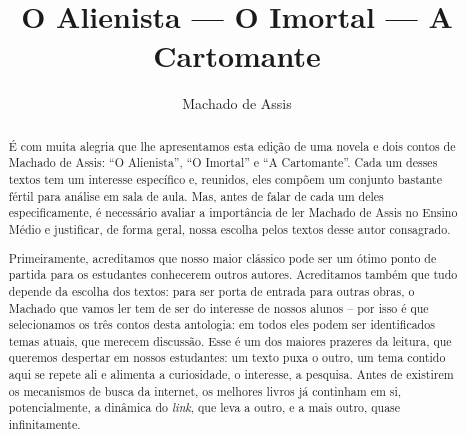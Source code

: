 \documentclass{extarticle}
\begin{document}
\newcommand{\AutorLivro}{Machado de Assis}
\newcommand{\TituloLivro}{O Alienista — O Imortal — A Cartomante}
\newcommand{\Tema}{Ficção, mistério e fantasia}
\newcommand{\Genero}{Conto, crônica e novela}
\newcommand{\imagemCapa}{./images/PNLD0048-01.png}
\newcommand{\issnppub}{978-65-89833-02-4}
\newcommand{\issnepub}{978-65-89833-03-1}
\newcommand{\colaborador}{{Carlos Rogério Duarte Barreiros}}


\title{\TituloLivro}
\author{\AutorLivro}
\def\authornotes{\colaborador}

\date{}
\maketitle

\begin{abstract}

É com muita alegria que lhe apresentamos esta edição de uma novela e
dois contos de Machado de Assis: ``O Alienista'', ``O Imortal'' e ``A
Cartomante''. Cada um desses textos tem um interesse específico e,
reunidos, eles compõem um conjunto bastante fértil para análise em sala
de aula. Mas, antes de falar de cada um deles especificamente, é
necessário avaliar a importância de ler Machado de Assis no Ensino Médio
e justificar, de forma geral, nossa escolha pelos textos desse autor
consagrado.

Primeiramente, acreditamos que nosso maior clássico pode ser um ótimo
ponto de partida para os estudantes conhecerem outros autores.
Acreditamos também que tudo depende da escolha dos textos: para ser
porta de entrada para outras obras, o Machado que vamos ler tem de ser
do interesse de nossos alunos -- por isso é que selecionamos os três
contos desta antologia: em todos eles podem ser identificados temas
atuais, que merecem discussão. Esse é um dos maiores prazeres da
leitura, que queremos despertar em nossos estudantes: um texto puxa o
outro, um tema contido aqui se repete ali e alimenta a curiosidade, o
interesse, a pesquisa. Antes de existirem os mecanismos de busca da
internet, os melhores livros já continham em si, potencialmente, a
dinâmica do \textit{link}, que leva a outro, e a mais outro, quase infinitamente.


\end{abstract}
\end{document}
